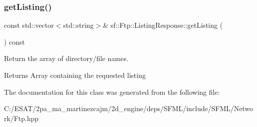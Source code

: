 \subsubsection{\texorpdfstring{get\+Listing()}{getListing()}}
{\footnotesize\ttfamily const std\+::vector$<$std\+::string$>$\& sf\+::\+Ftp\+::\+Listing\+Response\+::get\+Listing (\begin{DoxyParamCaption}{ }\end{DoxyParamCaption}) const}



Return the array of directory/file names. 

\begin{DoxyReturn}{Returns}
Array containing the requested listing 
\end{DoxyReturn}


The documentation for this class was generated from the following file\+:\begin{DoxyCompactItemize}
\item 
C\+:/\+E\+S\+A\+T/2pa\+\_\+ma\+\_\+martinezcajm/2d\+\_\+engine/deps/\+S\+F\+M\+L/include/\+S\+F\+M\+L/\+Network/Ftp.\+hpp\end{DoxyCompactItemize}
